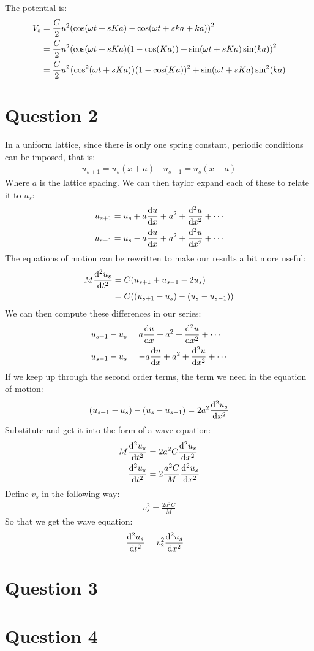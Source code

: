 \documentclass[12pt]{article}
\begin{document}
\begin{enumerate}[label=\alph*)]
  The potential is:
  \begin{align*}
    V_s&=\frac{C}{2}u^2\qty(\cos(\omega t+sKa)-\cos(\omega t+ska+ka))^2\\
       &=\frac{C}{2}u^2\qty(\cos(\omega t +sKa)(1-\cos(Ka))+
         \sin(\omega t+ sKa)\sin(k a))^2\\
       &=\frac{C}{2}u^2\qty(\cos^2(\omega t+sKa))(1-\cos(Ka))^2+
         \sin(\omega t+ sKa)\sin^2(k a)
  \end{align*}
  
\end{enumerate}
\section*{Question 2}
In a uniform lattice, since there is only one spring constant, periodic conditions can be imposed, that is:
\begin{align*}
  u_{s+1}=u_s(x+a)\quad u_{s-1}=u_s(x-a)
\end{align*}
Where $a$ is the lattice spacing. We can then taylor expand each of these to relate it to $u_s$:
\begin{align*}
  u_{s+1}&=u_s+a\dv{u}{x}+a^2+\dv[2]{u}{x}+\cdots\\
  u_{s-1}&=u_s-a\dv{u}{x}+a^2+\dv[2]{u}{x}+\cdots
\end{align*}
The equations of motion can be rewritten to make our results a bit more useful:
\begin{align*}
  M\dv[2]{u_s}{t}&=C\qty(u_{s+1}+u_{s-1}-2u_s)\\
  &=C\qty((u_{s+1}- u_s) - (u_{s}-u_{s-1}))
\end{align*}
We can then compute these differences in our series:
\begin{align*}
  u_{s+1}-u_s&=a\dv{u}{x}+a^2+\dv[2]{u}{x}+\cdots\\
  u_{s-1}-u_s&=-a\dv{u}{x}+a^2+\dv[2]{u}{x}+\cdots
\end{align*}
If we keep up through the second order terms, the term we need in the equation of motion:
\begin{align*}
  (u_{s+1}- u_s) - (u_{s}-u_{s-1})=2a^2\dv[2]{u_s}{x}
\end{align*}
Substitute and get it into the form of a wave equation:
\begin{align*}
  M\dv[2]{u_s}{t}&=2a^2C\dv[2]{u_s}{x}\\
  \dv[2]{u_s}{t}&=2\frac{a^2C}{M}\dv[2]{u_s}{x}
\end{align*}
Define $v_s$ in the following way:
\begin{align*}
  v_s^2=\frac{2a^2C}{M}
\end{align*}
So that we get the wave equation:
\begin{align*}
  \dv[2]{u_s}{t}&=v_2^2\dv[2]{u_s}{x}
\end{align*}
\section*{Question 3}
\section*{Question 4}
\end{document}

